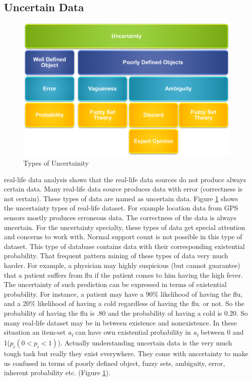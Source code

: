 \subsection{Uncertain Data}
\begin{figure}
\centering
  \includegraphics[width=.9\textwidth]{images/uncertainity_type.jpg}
\caption{Types of Uncertainity}
\label{figure:uncertainity_type}
\end{figure}
real-life data analysis shows that the real-life data sources do not produce always certain data. Many real-life data source produces data with error (correctness is not certain). These types of data are named as uncertain data. Figure \ref{figure:uncertainity_type} shows the uncertainty types of real-life dataset. For example location data from GPS sensors mostly produces erroneous data. The correctness of the data is always uncertain. For the uncertainty specialty, these types of data get special attention and concerns to work with. Normal support count is not possible in this type of dataset. This type of database contains data with their corresponding existential probability. That frequent pattern mining of these types of data very much harder. For example, a physician may highly suspicious (but cannot guarantee) that a patient suffers from flu if the patient comes to him having the high fever. The uncertainty of such prediction can be expressed in terms of existential probability. For instance, a patient may have a 90\% likelihood of having the flu, and a 20\% likelihood of having a cold regardless of having the flu. or not. So the probability of having the flu is .80 and the probability of having a cold is 0.20. So many real-life dataset may be in between existence and nonexistence. In these situation an item-set \emph{a\textsubscript{i}} can have own existential probability in \emph{a\textsubscript{i}} between 0 and 1($p_i(0<p_i<1)$). Actually understanding uncertain data is the very much tough task but really they exist everywhere. They come with uncertainty to make us confused in terms of poorly defined object, fuzzy sets, ambiguity, error, inherent probability etc. (Figure \ref{figure:uncertainity_type}).\\

